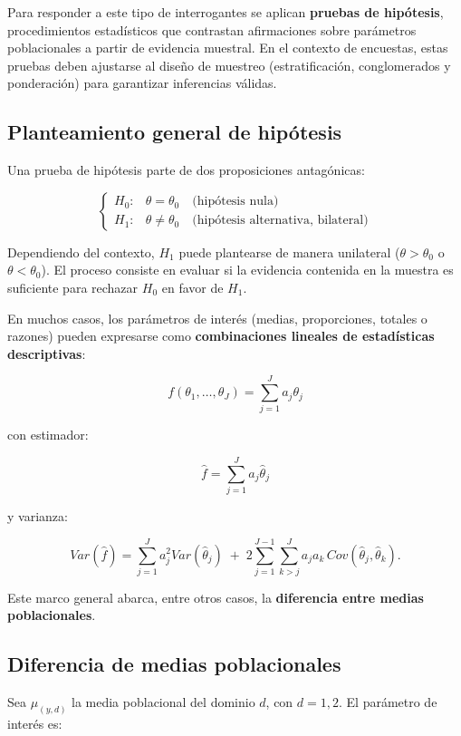 \documentclass[
  12pt,
]{book}
\begin{document}
Para responder a este tipo de interrogantes se aplican \textbf{pruebas de hipótesis}, procedimientos estadísticos que contrastan afirmaciones sobre parámetros poblacionales a partir de evidencia muestral. En el contexto de encuestas, estas pruebas deben ajustarse al diseño de muestreo (estratificación, conglomerados y ponderación) para garantizar inferencias válidas.

\subsection{Planteamiento general de hipótesis}\label{planteamiento-general-de-hipuxf3tesis}

Una prueba de hipótesis parte de dos proposiciones antagónicas:

\[
\begin{cases}
H_{0}: & \theta = \theta_0 \quad \text{(hipótesis nula)} \\
H_{1}: & \theta \neq \theta_0 \quad \text{(hipótesis alternativa, bilateral)}
\end{cases}
\]

Dependiendo del contexto, \(H_1\) puede plantearse de manera unilateral (\(\theta > \theta_0\) o \(\theta < \theta_0\)). El proceso consiste en evaluar si la evidencia contenida en la muestra es suficiente para rechazar \(H_0\) en favor de \(H_1\).

En muchos casos, los parámetros de interés (medias, proporciones, totales o razones) pueden expresarse como \textbf{combinaciones lineales de estadísticas descriptivas}:

\[
f(\theta_1,\ldots,\theta_J) = \sum_{j=1}^J a_j \theta_j
\]

con estimador:

\[
\hat{f} = \sum_{j=1}^J a_j \hat{\theta}_j
\]

y varianza:

\[
Var(\hat{f}) = \sum_{j=1}^J a_j^2 Var(\hat{\theta}_j) \;+\; 2\sum_{j=1}^{J-1}\sum_{k>j}^J a_j a_k \, Cov(\hat{\theta}_j,\hat{\theta}_k).
\]

Este marco general abarca, entre otros casos, la \textbf{diferencia entre medias poblacionales}.

\subsection{Diferencia de medias poblacionales}\label{diferencia-de-medias-poblacionales}

Sea \(\mu_{(y,d)}\) la media poblacional del dominio \(d\), con \(d=1,2\). El parámetro de interés es:
\end{document}
